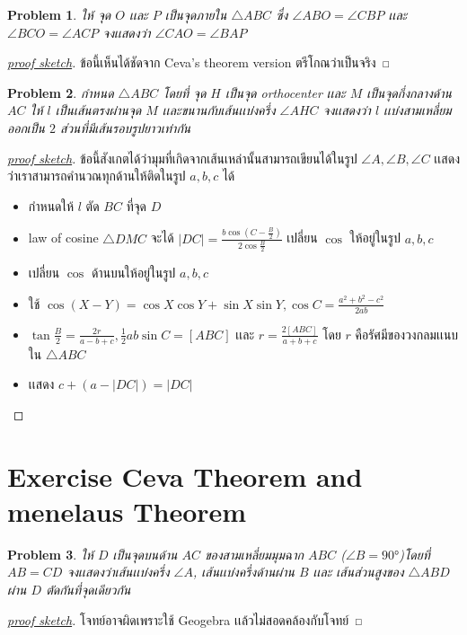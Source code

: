 \documentclass[a4paper,12pt]{article}
\newtheorem{problem}{Problem}[section]
\begin{document}
		\begin{problem}
			ให้ จุด $O$ เเละ $P$ เป็นจุดภายใน $\bigtriangleup{ABC}$ ซึ่ง $\angle{ABO} = \angle{CBP}$ 
			เเละ $\angle{BCO} = \angle{ACP}$  จงเเสดงว่า $\angle{CAO} = \angle{BAP}$ 
		\end{problem}
		\begin{proof}[\underline{proof sketch}]
			ข้อนี้เห็นได้ชัดจาก Ceva's theorem version ตรีโกณว่าเป็นจริง
			
		\end{proof}
		\begin{problem}
			กำหนด $\bigtriangleup{ABC}$ โดยที่ จุด $H$ เป็นจุด orthocenter เเละ $M$ เป็นจุดกึ่งกลางด้าน $AC$ ให้ $l$  เป็นเส้นตรงผ่านจุด $M$ เเละขนานกับเส้นเเบ่งครึ่ง $\angle{AHC}$ จงเเสดงว่า $l$ เเบ่งสามเหลี่ยมออกเป็น $2$ ส่วนที่มีเส้นรอบรูปยาวเท่ากัน
		\end{problem} 
		\begin{proof}[\underline{proof sketch}]
			ข้อนี้สังเกตได้ว่ามุมที่เกิดจากเส้นเหล่านั้นสามารถเขียนได้ในรูป $\angle{A}, \angle{B}, \angle{C}$ เเสดงว่าเราสามารถคำนวณทุกด้านให้ติดในรูป $a,b,c$ ได้
		\begin{itemize}
			\item กำหนดให้ $l$ ตัด  $BC$ ที่จุด $D$
			\item law of cosine $\bigtriangleup{DMC}$ จะได้ $|DC| = \frac{b\cos{(C-\frac{B}{2})}}{2\cos{\frac{B}{2}}}$ เปลี่ยน $\cos$ ให้อยู่ในรูป $a,b,c$
			\item เปลี่ยน $\cos$ ด้านบนให้อยู่ในรูป $a,b,c$
			\item ใช้ $\cos{(X - Y)} = \cos{X}\cos{Y} + \sin{X}\sin{Y}, \cos{C} = \frac{a^2 + b^2 - c^2}{2ab}$ 
			\item $\tan{\frac{B}{2}} = \frac{2r}{a-b+c}, \frac{1}{2}ab\sin{C} = [ABC]$ เเละ $r = \frac{2[ABC]}{a + b + c}$ โดย $r$ คือรัศมีของวงกลมเเนบใน $\bigtriangleup{ABC}$
			\item เเสดง $c + (a-|DC|) = |DC|$
		\end{itemize}
	    \end{proof}
    
    
	\newpage
	\section{Exercise Ceva Theorem and menelaus Theorem}
		\begin{problem}
			ให้ $D$ เป็นจุดบนด้าน $AC$ ของสามเหลี่ยมมุมฉาก $ABC$ ($\angle{B} = \ang{90}$)โดยที่ $AB = CD$  จงเเสดงว่าเส้นเเบ่งครึ่ง $\angle{A}$, เส้นเเบ่งครึ่งด้านผ่าน $B$ เเละ เส้นส่วนสูงของ $\bigtriangleup{ABD}$ ผ่าน $D$ ตัดกันที่จุดเดียวกัน
		\end{problem}
	\begin{proof}[\underline{proof sketch}]
		โจทย์อาจผิดเพราะใช้ Geogebra เเล้วไม่สอดคล้องกับโจทย์
	\end{proof}
\end{document}
